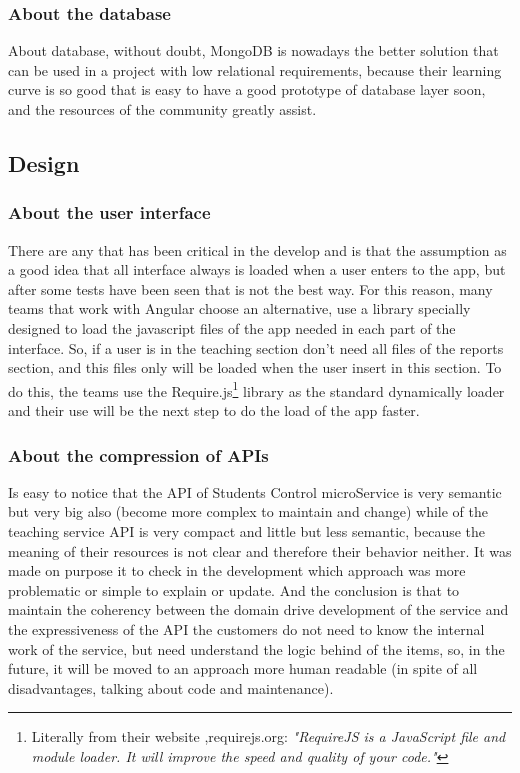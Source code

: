 \subsubsection{About the database}

About database, without doubt, MongoDB is nowadays the better solution that
can be used in a project with low relational requirements, because their learning
curve is so good that is easy to have a good prototype of database layer soon,
and the resources of the community greatly assist.

\subsection {Design}

\subsubsection{About the user interface}

There are any that has been critical in the develop and is that the assumption
as a good idea that all interface always is loaded when a user enters to the app,
but after some tests have been seen that is not the best way.  For this reason,
many teams that work with Angular choose an alternative, use a library specially
designed to load the javascript files of the app needed in each part of the interface.
\intro
So, if a user is in the teaching section don't need all files of the reports section, and this files only will be loaded when the user insert in this section. To do this,
the teams use the Require.js\footnote{Literally from their website ,requirejs.org: \textit{"RequireJS is a
JavaScript file and module loader. It will improve the speed and quality of your code."}} library as
the standard dynamically loader and their use will be the next step to do the
load of the app faster.
\subsubsection{About the compression of APIs}

Is easy to notice that the API of Students Control microService is very semantic
but very big also (become more complex to maintain and change) while of the
teaching service API is very compact and little but less semantic, because the
meaning of their resources is not clear and therefore their behavior neither.
It was made on purpose it to check in the development which approach was more
problematic or simple to explain or update.
\intro
And the conclusion is that to maintain the coherency between the domain drive
development of the service and the expressiveness of the API the customers do not
need to know the internal work of the service, but need understand the logic
behind of the items, so, in the future, it will be moved to an approach more human
readable (in spite of all disadvantages, talking about code and maintenance).

